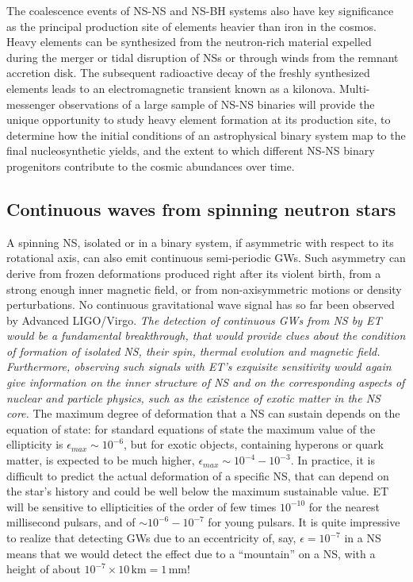 The coalescence events of NS-NS and NS-BH systems also have key significance as the principal production site of elements heavier than iron in the cosmos. Heavy elements can be synthesized from the neutron-rich material expelled during the merger or tidal disruption of NSs or through winds from the remnant accretion disk. The subsequent radioactive decay of the freshly synthesized elements leads to an electromagnetic transient known as a kilonova. Multi-messenger observations of a large sample of NS-NS binaries will provide the unique opportunity to study heavy element formation at its production site, to determine how the initial conditions of an astrophysical binary system map to the final nucleosynthetic yields, and the extent to which different NS-NS binary progenitors contribute to the cosmic abundances over time.

\subsection{Continuous waves from spinning neutron stars}

A spinning NS, isolated or in a binary system, if asymmetric with respect to its rotational axis, can also emit continuous semi-periodic GWs. Such asymmetry can derive from frozen deformations produced right after its violent birth, from a strong enough inner magnetic field, or from non-axisymmetric motions or density perturbations. 
No continuous gravitational wave signal has so far been observed  by Advanced LIGO/Virgo.
\emph{The detection of continuous GWs from NS by ET would be a fundamental breakthrough, that would provide   clues about  the condition of formation of isolated NS,  their spin, thermal evolution and magnetic field. Furthermore,  observing such signals with ET's exquisite sensitivity would again give information on the inner structure of NS and on the corresponding aspects of nuclear and particle physics, such as the existence of exotic matter in the NS core.} 
The maximum degree of deformation that a NS can sustain depends on the equation of state: for standard equations of state the maximum value of the ellipticity is $\epsilon_{max} \sim 10^{-6}$, but for exotic objects, containing hyperons or quark matter, is expected to be much higher, $\epsilon_{max}\sim 10^{-4}-10^{-3}$. In practice, it is difficult to predict the actual deformation of  a specific NS, that can depend on the star's history and could be well below the maximum sustainable value.   ET will be sensitive to ellipticities of the order of few times  $10^{-10}$ for the nearest millisecond pulsars, and of $\sim 10^{-6}-10^{-7}$ for young pulsars. 
 It is quite impressive to realize that detecting GWs due to an eccentricity of, say, $\epsilon=10^{-7}$ in a NS means that we would detect the effect  due to a ``mountain'' on a NS, with a  height of about $10^{-7}\times 10\, \mathrm{km}=1\, \mathrm{mm}$!  %

